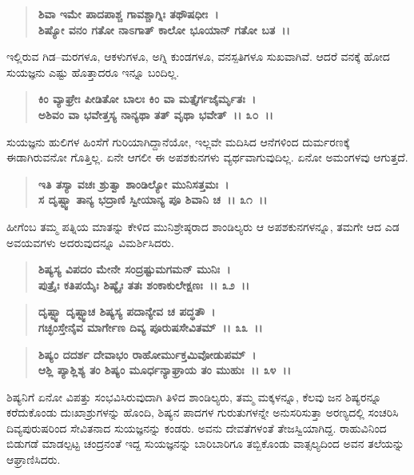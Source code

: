 \begin{verse}
\textbf{ಶಿವಾ ಇಮೇ ಪಾದಪಾಶ್ಚ ಗಾವಶ್ಚಾಗ್ನಿಃ ತಥೌಷಧೀಃ~।}\\\textbf{ಶಿಷ್ಯೋ ವನಂ ಗತೋ ನಾಽಗಾತ್ ಕಾಲೋ ಭೂಯಾನ್ ಗತೋ ಬತ~।।}
\end{verse}

ಇಲ್ಲಿರುವ ಗಿಡ–ಮರಗಳೂ, ಆಕಳುಗಳೂ, ಅಗ್ನಿ ಕುಂಡಗಳೂ, ವನಸ್ಪತಿಗಳೂ ಸುಖವಾಗಿವೆ. ಆದರೆ ವನಕ್ಕೆ ಹೋದ ಸುಯಜ್ಞನು ಎಷ್ಟು ಹೊತ್ತಾದರೂ ಇನ್ನೂ ಬಂದಿಲ್ಲ.

\begin{verse}
\textbf{ಕಿಂ ವ್ಯಾಘ್ರೇಃ ಪೀಡಿತೋ ಬಾಲಃ ಕಿಂ ವಾ ಮತ್ತೈರ್ಗಜೈರ್ಮೃತಃ~।}\\\textbf{ಅಶಿವಂ ವಾ ಭವೇತ್ತಸ್ಯ ನಾನ್ಯಥಾ ತತ್ ವೃಥಾ ಭವೇತ್~।। ೩೦~।।}
\end{verse}

ಸುಯಜ್ಞನು ಹುಲಿಗಳ ಹಿಂಸೆಗೆ ಗುರಿಯಾಗಿದ್ದಾನೆಯೋ, ಇಲ್ಲವೇ ಮದಿಸಿದ ಆನೆಗಳಿಂದ ದುರ್ಮರಣಕ್ಕೆ ಈಡಾಗಿರುವನೋ ಗೊತ್ತಿಲ್ಲ. ಏನೇ ಆಗಲೀ ಈ ಅಪಶಕುನಗಳು ವ್ಯರ್ಥವಾಗುವುದಿಲ್ಲ. ಏನೋ ಅಮಂಗಳವು ಆಗುತ್ತದೆ.

\begin{verse}
\textbf{ಇತಿ ತಸ್ಯಾ ವಚಃ ಶ್ರುತ್ವಾ ಶಾಂಡಿಲ್ಯೋ ಮುನಿಸತ್ತಮಃ~।}\\\textbf{ಸ ದೃಷ್ಟ್ವಾ ತಾನ್ಯ ಭದ್ರಾಣಿ ಸ್ವೀಯಾನ್ಯ ಪೂ ಶಿವಾನಿ ಚ~।। ೩೧~।।}
\end{verse}

ಹೀಗೆಂಬ ತಮ್ಮ ಪತ್ನಿಯ ಮಾತನ್ನು ಕೇಳಿದ ಮುನಿಶ್ರೇಷ್ಠರಾದ ಶಾಂಡಿಲ್ಯರು ಆ ಅಪಶಕುನಗಳನ್ನೂ, ತಮಗೇ ಆದ ಎಡ ಅವಯವಗಳು ಅದರುವುದನ್ನೂ ವಿಮರ್ಶಿಸಿದರು.

\begin{verse}
\textbf{ಶಿಷ್ಯಸ್ಯ ವಿಪದಂ ಮೇನೇ ಸಂದ್ರಷ್ಟುಮಗಮನ್ ಮುನಿಃ~।}\\\textbf{ಪುತ್ರೈಃ ಕತಿಪಯೈಃ ಶಿಷ್ಯೈಃ ತತಃ ಶಂಕಾಕುಲೇಕ್ಷಣಃ~।। ೩೨~।।} 
\end{verse}

\begin{verse}
\textbf{ದೃಷ್ಟ್ವಾ ದೃಷ್ಟ್ವಾಚ ಶಿಷ್ಯಸ್ಯ ಪದಾನ್ಯೇವ ಚ ಪದ್ಧತೌ~।}\\\textbf{ಗಚ್ಛಂಸ್ತೇನೈವ ಮಾರ್ಗೇಣ ದಿವ್ಯ ಪೂರುಷಸೇವಿತಮ್~।। ೩೩~।।} 
\end{verse}

\begin{verse}
\textbf{ಶಿಷ್ಯಂ ದದರ್ಶ ದೇವಾಭಂ ರಾಹೋರ್ಮುಕ್ತಮಿವೋಡುಪಮ್~।}\\\textbf{ಆಶ್ಲಿ ಪ್ಯಾಶ್ಲಿಶ್ಯ ತಂ ಶಿಷ್ಯಂ ಮೂರ್ಧನ್ಯಾಘ್ರಾಯ ತಂ ಮುಹುಃ~।। ೩೪~।।}
\end{verse}

ಶಿಷ್ಯನಿಗೆ ಏನೋ ವಿಪತ್ತು ಸಂಭವಿಸಿರುವುದಾಗಿ ತಿಳಿದ ಶಾಂಡಿಲ್ಯರು, ತಮ್ಮ ಮಕ್ಕಳನ್ನೂ, ಕೆಲವು ಜನ ಶಿಷ್ಯರನ್ನೂ ಕರೆದುಕೊಂಡು ದುಃಖಾಶ್ರುಗಳನ್ನು ಹೊಂದಿ, ಶಿಷ್ಯನ ಪಾದಗಳ ಗುರುತುಗಳನ್ನೇ ಅನುಸರಿಸುತ್ತಾ ಅರಣ್ಯದಲ್ಲಿ ಸಂಚರಿಸಿ ದಿವ್ಯಪುರುಷರಿಂದ ಸೇವಿತನಾದ ಸುಯಜ್ಞನನ್ನು ಕಂಡರು. ಅವನು ದೇವತೆಗಳಂತೆ ತೇಜಸ್ವಿಯಾಗಿದ್ದ. ರಾಹುವಿನಿಂದ ಬಿಡುಗಡೆ ಮಾಡಲ್ಪಟ್ಟ ಚಂದ್ರನಂತೆ ಇದ್ದ ಸುಯಜ್ಞನನ್ನು ಬಾರಿಬಾರಿಗೂ ತಬ್ಬಿಕೊಂಡು ವಾತ್ಸಲ್ಯದಿಂದ ಅವನ ತಲೆಯನ್ನು ಆಘ್ರಾಣಿಸಿದರು.

